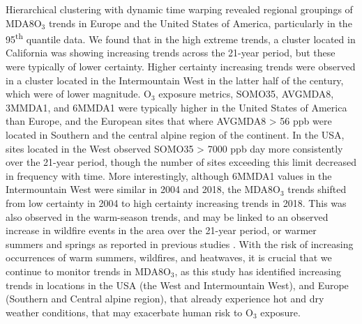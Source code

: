 \documentclass[journal abbreviation, manuscript]{copernicus}
\begin{document}
Hierarchical clustering with dynamic time warping revealed regional groupings of MDA8O$_3$ trends in Europe and the United States of America, particularly in the 95\textsuperscript{th} quantile data. We found that in the high extreme trends, a cluster located in California was showing increasing trends across the 21-year period, but these were typically of lower certainty. Higher certainty increasing trends were observed in a cluster located in the Intermountain West in the latter half of the century, which were of lower magnitude. O$_3$ exposure metrics, SOMO35, AVGMDA8, 3MMDA1, and 6MMDA1 were typically higher in the United States of America than Europe, and the European sites that where AVGMDA8 > 56 ppb were located in Southern and the central alpine region of the continent. In the USA, sites located in the West observed SOMO35 > 7000 ppb day more consistently over the 21-year period, though the number of sites exceeding this limit decreased in frequency with time. More interestingly, although 6MMDA1 values in the Intermountain West were similar in 2004 and 2018, the MDA8O$_3$ trends shifted from low certainty in 2004 to high certainty increasing trends in 2018. This was also observed in the warm-season trends, and may be linked to an observed increase in wildfire events in the area over the 21-year period, or warmer summers and springs as reported in previous studies \citep{Lin2017, Li2021, Peterson2021, Iglesias2022}. With the risk of increasing occurrences of warm summers, wildfires, and heatwaves, it is crucial that we continue to monitor trends in MDA8O$_3$, as this study has identified increasing trends in locations in the USA (the West and Intermountain West), and Europe (Southern and Central alpine region), that already experience hot and dry weather conditions, that may exacerbate human risk to O$_3$ exposure.
\end{document}
